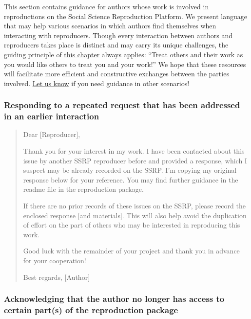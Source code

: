 This section contains guidance for authors whose work is involved in
reproductions on the Social Science Reproduction Platform. We present
language that may help various scenarios in which authors find
themselves when interacting with reproducers. Though every interaction
between authors and reproducers takes place is distinct and may carry
its unique challenges, the guiding principle of
\href{https://bitss.github.io/ACRE/guidance-for-a-constructive-exchange-between-reproducers-and-original-authors.html}{this
chapter} always applies: ``Treat others and their work as you would like
others to treat you and your work!'' We hope that these resources will
facilitate more efficient and constructive exchanges between the parties
involved. \href{emailto:acre@berkeley.edu}{Let us know} if you need
guidance in other scenarios!

\subsubsection{Responding to a repeated request that has been addressed in an earlier interaction}

\begin{quote}
Dear {[}Reproducer{]},

Thank you for your interest in my work. I have been contacted about this
issue by another SSRP reproducer before and provided a response, which I
suspect may be already recorded on the SSRP. I'm copying my original
response below for your reference. You may find further guidance in the
readme file in the reproduction package.

If there are no prior records of these issues on the SSRP, please record
the enclosed response {[}and materials{]}. This will also help avoid the
duplication of effort on the part of others who may be interested in
reproducing this work.

Good luck with the remainder of your project and thank you in advance
for your cooperation!

Best regards, {[}Author{]}
\end{quote}

\subsubsection{Acknowledging that the author no longer has access to certain part(s) of the reproduction package}

